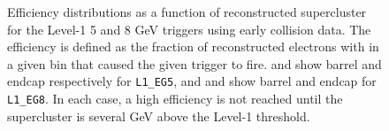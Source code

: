 \begin{figure}[htb]
\begin{center}
  \end{center}
  \caption[\fixspacing Efficiency as a function of
  reconstructed supercluster \Et for Level-1 triggers]
  {\fixspacing Efficiency distributions as a function of
  reconstructed supercluster \Et for the Level-1 5 and 8 GeV triggers
  using early collision data.
  The efficiency is defined as the fraction of reconstructed electrons
  with \Et in a given bin that caused the given trigger to fire.
   and  show barrel and endcap respectively for 
  \texttt{L1\_EG5}, 
  and  and  show barrel and endcap for
  \texttt{L1\_EG8}. 
  In each case, a high efficiency is not reached until
  the supercluster \Et is several GeV above the Level-1 threshold.
  }
  \label{fig:L1Effs}
 \end{figure}








